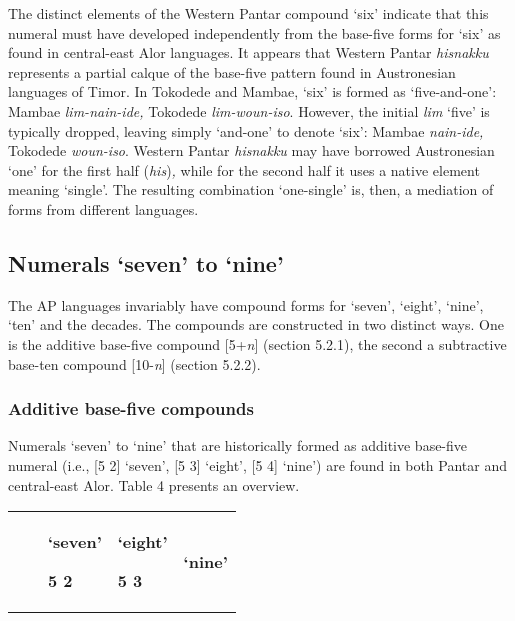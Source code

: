 {The distinct elements of the Western Pantar compound `six' indicate that this numeral must have developed independently from the base-five forms for `six' as found in central-east Alor languages. It appears that Western Pantar \textit{hisnakku}\textit{{\ng}} represents a partial calque of the base-five pattern found in Austronesian languages of Timor. In Tokodede and Mambae, `six' is formed as `five-and-one': Mambae \textit{lim-nain-ide,} Tokodede \textit{lim-woun-iso}. However, the initial \textit{lim} `five' is typically dropped, leaving simply `and-one' to denote `six': Mambae \textit{nain-ide,} Tokodede \textit{woun-iso}. Western Pantar \textit{hisnakku}\textit{{\ng}} may have borrowed Austronesian `one' for the first half (\textit{his})\textit{,} while for the second half it uses a native element meaning `single'. The resulting combination `one-single' is, then, a mediation of forms from different languages.

\subsection{Numerals `seven' to `nine'}
The AP languages invariably have compound forms for `seven', `eight', `nine', `ten' and the decades. The compounds are constructed in two distinct ways. One is the additive base-five compound [5+\textit{n}] (section 5.2.1), the second a subtractive base-ten compound [10-\textit{n}] (section 5.2.2).

\subsubsection{Additive base-five compounds}
Numerals `seven' to `nine' that are historically formed as additive base-five numeral (i.e., [5 2] `seven', [5 3] `eight', [5 4] `nine') are found in both Pantar and central-east Alor. Table 4 presents an overview.



\begin{table}


\begin{tabular}{lllll}

&  & {\bfseries `seven'}

{\bfseries 5 2} & {\bfseries `eight'}

{\bfseries 5 3} & {\bfseries `nine'}


\end{tabular}
\end{table}}
